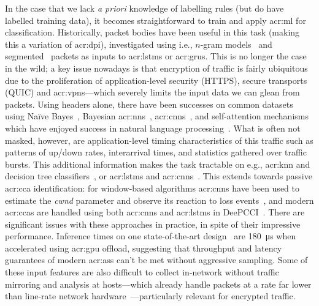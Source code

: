 In the case that we lack \emph{a priori} knowledge of labelling rules (but do have labelled training data), it becomes straightforward to train and apply \gls{acr:ml} for classification.
Historically, packet bodies have been useful in this task (making this a variation of \gls{acr:dpi}), investigated using i.e., $n$-gram models~\parencite{DBLP:journals/ton/YunW0Z16} and segmented~\parencite{DBLP:conf/iwqos/LiXNZX18} packets as inputs to \glspl{acr:lstm} or \glspl{acr:gru}.
This is no longer the case in the wild; a key issue nowadays is that encryption of traffic is fairly ubiquitous due to the proliferation of application-level security (HTTPS), secure transports (QUIC) and \glspl{acr:vpn}---which severely limits the input data we can glean from packets.
Using headers alone, there have been successes on common datasets using Na\"{i}ve Bayes~\parencite{DBLP:conf/sigmetrics/MooreZ05}, Bayesian \glspl{acr:nn}~\parencite{DBLP:journals/tnn/AuldMG07}, \glspl{acr:cnn}~\parencite{DBLP:journals/soco/LotfollahiSZS20}, and self-attention mechanisms~\parencite{DBLP:conf/sigcomm/Xie0JDSLSX20} which have enjoyed success in natural language processing~\parencite{DBLP:conf/nips/VaswaniSPUJGKP17}.
What is often not masked, however, are application-level timing characteristics of this traffic such as patterns of up/down rates, interarrival times, and statistics gathered over traffic bursts.
This additional information makes the task tractable on e.g., \gls{acr:knn} and decision tree classifiers~\parencite{DBLP:conf/icissp/Draper-GilLMG16}, or \glspl{acr:lstm} and \glspl{acr:cnn}~\parencite{DBLP:journals/tnsm/AcetoCMP19}.
This extends towards passive \gls{acr:cca} identification: for window-based algorithms \glspl{acr:cnn} have been used to estimate the \emph{cwnd} parameter and observe its reaction to loss events~\parencite{DBLP:conf/icccn/HagosEYK18}, and modern \glspl{acr:cca} are handled using both \glspl{acr:cnn} and \glspl{acr:lstm} in DeePCCI~\parencite{DBLP:conf/sigcomm/SanderRHW19}.
There are significant issues with these approaches in practice, in spite of their impressive performance.
Inference times on one state-of-the-art design~\parencite{DBLP:conf/sigcomm/Xie0JDSLSX20} are \qty{180}{\micro\second} when accelerated using \gls{acr:gpu} offload, suggesting that throughput and latency guarantees of modern \glspl{acr:as} can't be met without aggressive sampling.
Some of these input features are also difficult to collect in-network without traffic mirroring and analysis at hosts---which already handle packets at a rate far lower than line-rate network hardware~\parencite{DBLP:conf/sigcomm/GuptaHCFRW18}---particularly relevant for encrypted traffic.


